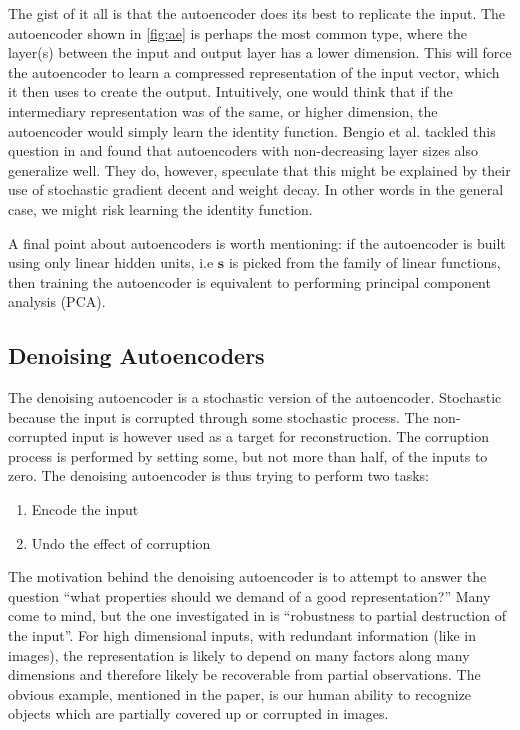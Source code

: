 \documentclass[11pt]{article}
\begin{document}
The gist of it all is that the autoencoder does its best to replicate the input.  The autoencoder shown in \ref{fig:ae} is perhaps the most common type, where the layer(s) between the input and output layer has a lower dimension.  This will force the autoencoder to learn a compressed representation of the input vector, which it then uses to create the output.  Intuitively, one would think that if the intermediary representation was of the same, or higher dimension, the autoencoder would simply learn the identity function.  Bengio et al. tackled this question in \cite{bengio07} and found that autoencoders with non-decreasing layer sizes also generalize well.  They do, however, speculate that this might be explained by their use of stochastic gradient decent and weight decay.  In other words in the general case, we might risk learning the identity function.

A final point about autoencoders is worth mentioning: if the autoencoder is built using only linear hidden units, i.e $\mathbf{s}$ is picked from the family of linear functions, then training the autoencoder is equivalent to performing principal component analysis (PCA).

\subsection{Denoising Autoencoders}

The denoising autoencoder is a stochastic version of the autoencoder.  Stochastic because the input is corrupted through some stochastic process.  The non-corrupted input is however used as a target for reconstruction.  The corruption process is performed by setting some, but not more than half, of the inputs to zero.  The denoising autoencoder is thus trying to perform two tasks:
\begin{enumerate}
\item Encode the input
\item Undo the effect of corruption
\end{enumerate}

The motivation behind the denoising autoencoder is to attempt to answer the question ``what properties should we demand of a good representation?''  Many come to mind, but the one investigated in \cite{bengio07} is ``robustness to partial destruction of the input''.  For high dimensional inputs, with redundant information (like in images), the representation is likely to depend on many factors along many dimensions and therefore likely be recoverable from partial observations.  The obvious example, mentioned in the paper, is our human ability to recognize objects which are partially covered up or corrupted in images.
\end{document}
